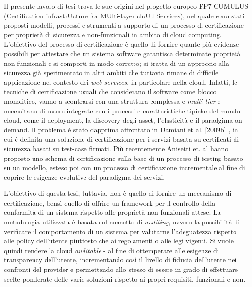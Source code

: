 \documentclass[../main.tex]{subfiles}
\begin{document}
Il presente lavoro di tesi trova le sue origini nel progetto europeo FP7 CUMULUS\cite{CumulusBigDoc} (Certification infrastrUcture for MUlti-layer cloUd Services), nel quale sono stati proposti modelli, processi e strumenti a supporto di un processo di certificazione per proprietà di sicurezza e non-funzionali in ambito di cloud computing.
L'obiettivo del processo di certificazione è quello di fornire quante più evidenze possibili per attestare che un sistema software garantisca determinate proprietà non funzionali e si comporti in modo corretto\cite{Ardagna:2015:SAC:2808687.2767005}; si tratta di un approccio alla sicurezza già sperimentato in altri ambiti che tuttavia rimane di difficile applicazione nel contesto dei \textit{web-services}, in particolare nella cloud\cite{Anisetti:2013:TSC:2460383.2460384}.
Infatti, le tecniche di certificazione usuali che considerano il software come blocco monolitico, vanno a scontrarsi con una struttura complessa e \textit{multi-tier}\cite{Anisetti:2013:TSC:2460383.2460384}
e necessitano di essere integrate con i processi e caratteristiche tipiche del mondo cloud, come il deployment, la discovery degli asset, l'elasticità e il paradgima on-demand.
Il problema è stato dapprima affrontato in Damiani et al. [2009b] \cite{5190685}, in cui è definita una soluzione di certificazione per i servizi basata su certificati di sicurezza basati su test-case firmati.
Più recentemente Anisetti et. al \cite{CertEvolutiva}\cite{CertSoa}\cite{6649614} hanno proposto uno schema di certificazione sulla base di un processo di testing basato su un modello, esteso poi con un processo di certificazione incrementale al fine di coprire le esigenze evolutive del paradigma dei servizi.

L'obiettivo di questa tesi, tuttavia, non è quello di fornire un meccanismo di certificazione, bensì quello di offrire un framework per il controllo della conformità di un sistema rispetto alle proprietà non funzionali attese.
La metodologia utilizzata è basata sul concetto di \textit{auditing}, ovvero la possibilità  di verificare il comportamento di un sistema per valutarne l'adeguatezza rispetto alle policy dell'utente piuttosto che ai regolamenti o alle legi vigenti.\cite{Ardagna:2015:SAC:2808687.2767005}
Si vuole quindi rendere la cloud \textit{auditable} - al fine di ottemperare alle esigenze di transparency dell'utente, incrementando così il livello di fiducia dell'utente nei confronti del provider e permettendo allo stesso di essere in grado di effettuare scelte ponderate delle varie soluzioni rispetto ai propri requisiti, funzionali e non.
\end{document}
